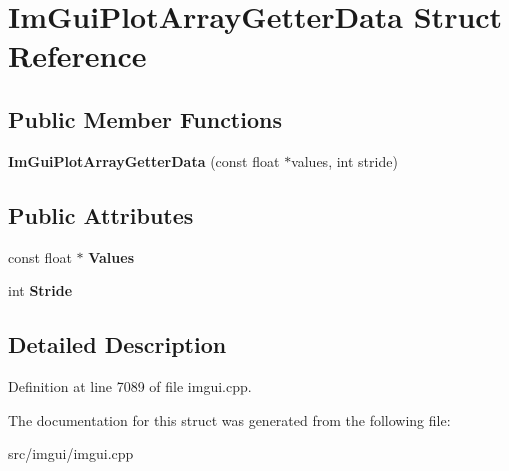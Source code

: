 \hypertarget{struct_im_gui_plot_array_getter_data}{}\section{Im\+Gui\+Plot\+Array\+Getter\+Data Struct Reference}
\label{struct_im_gui_plot_array_getter_data}
\subsection*{Public Member Functions}
\begin{DoxyCompactItemize}
\item 
\hypertarget{struct_im_gui_plot_array_getter_data_a9c4037621f1c247957c04dc8ae1f2903}{}{\bfseries Im\+Gui\+Plot\+Array\+Getter\+Data} (const float $\ast$values, int stride)\label{struct_im_gui_plot_array_getter_data_a9c4037621f1c247957c04dc8ae1f2903}

\end{DoxyCompactItemize}
\subsection*{Public Attributes}
\begin{DoxyCompactItemize}
\item 
\hypertarget{struct_im_gui_plot_array_getter_data_aa40ff2e945549744fc622891089ae0fd}{}const float $\ast$ {\bfseries Values}\label{struct_im_gui_plot_array_getter_data_aa40ff2e945549744fc622891089ae0fd}

\item 
\hypertarget{struct_im_gui_plot_array_getter_data_aecb2cce4ea91d95ec81937de656cfcd6}{}int {\bfseries Stride}\label{struct_im_gui_plot_array_getter_data_aecb2cce4ea91d95ec81937de656cfcd6}

\end{DoxyCompactItemize}


\subsection{Detailed Description}


Definition at line 7089 of file imgui.\+cpp.



The documentation for this struct was generated from the following file\+:\begin{DoxyCompactItemize}
\item 
src/imgui/imgui.\+cpp\end{DoxyCompactItemize}
